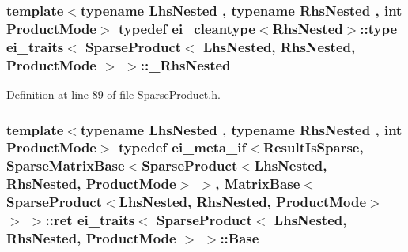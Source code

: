 \hypertarget{structei__traits_3_01_sparse_product_3_01_lhs_nested_00_01_rhs_nested_00_01_product_mode_01_4_01_4_a1ff0fdadc9a06c66c6d5e93e5f4bfb39}{
\subsubsection[{\-\_\-\-Rhs\-Nested}]{\setlength{\rightskip}{0pt plus 5cm}template$<$typename Lhs\-Nested , typename Rhs\-Nested , int Product\-Mode$>$ typedef {\bf ei\-\_\-cleantype}$<$Rhs\-Nested$>$\-::{\bf type} {\bf ei\-\_\-traits}$<$ {\bf Sparse\-Product}$<$ Lhs\-Nested, Rhs\-Nested, Product\-Mode $>$ $>$\-::{\bf \-\_\-\-Rhs\-Nested}}}\label{structei__traits_3_01_sparse_product_3_01_lhs_nested_00_01_rhs_nested_00_01_product_mode_01_4_01_4_a1ff0fdadc9a06c66c6d5e93e5f4bfb39}


Definition at line 89 of file Sparse\-Product.\-h.

\hypertarget{structei__traits_3_01_sparse_product_3_01_lhs_nested_00_01_rhs_nested_00_01_product_mode_01_4_01_4_aa4c65bac4c417e32ad67aef520b8c5ea}{
\subsubsection[{Base}]{\setlength{\rightskip}{0pt plus 5cm}template$<$typename Lhs\-Nested , typename Rhs\-Nested , int Product\-Mode$>$ typedef {\bf ei\-\_\-meta\-\_\-if}$<${\bf Result\-Is\-Sparse}, {\bf Sparse\-Matrix\-Base}$<${\bf Sparse\-Product}$<$Lhs\-Nested, Rhs\-Nested, Product\-Mode$>$ $>$, {\bf Matrix\-Base}$<${\bf Sparse\-Product}$<$Lhs\-Nested, Rhs\-Nested, Product\-Mode$>$ $>$ $>$\-::{\bf ret} {\bf ei\-\_\-traits}$<$ {\bf Sparse\-Product}$<$ Lhs\-Nested, Rhs\-Nested, Product\-Mode $>$ $>$\-::{\bf Base}}}\label{structei__traits_3_01_sparse_product_3_01_lhs_nested_00_01_rhs_nested_00_01_product_mode_01_4_01_4_aa4c65bac4c417e32ad67aef520b8c5ea}


